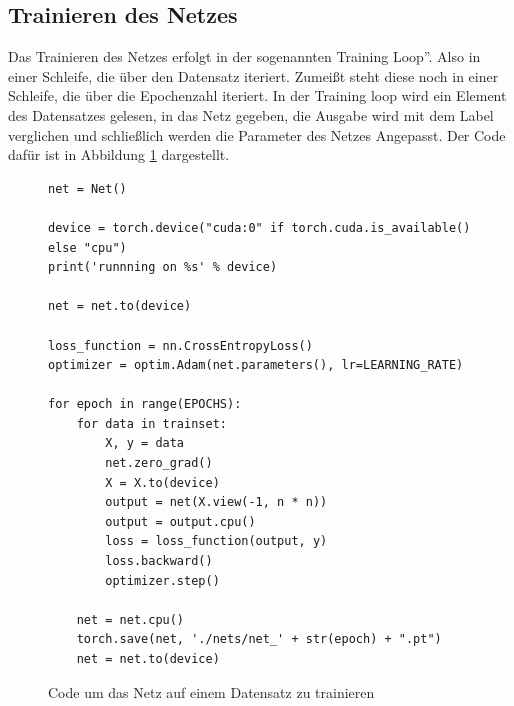 \documentclass[11pt]{article}
\begin{document}
\subsection{Trainieren des Netzes}
Das Trainieren des Netzes erfolgt in der sogenannten \glqq Training Loop''. Also in einer Schleife, die über den Datensatz iteriert. Zumeißt steht diese noch in einer Schleife, die über die Epochenzahl iteriert. In der Training loop wird ein Element des Datensatzes gelesen, in das Netz gegeben, die Ausgabe wird mit dem Label verglichen und schließlich werden die Parameter des Netzes Angepasst. Der Code dafür ist in Abbildung \ref{Code_train_loop} dargestellt.
 \begin{figure}[h]
 	\begin{verbatim}
net = Net()

device = torch.device("cuda:0" if torch.cuda.is_available() else "cpu")
print('runnning on %s' % device)

net = net.to(device)

loss_function = nn.CrossEntropyLoss()
optimizer = optim.Adam(net.parameters(), lr=LEARNING_RATE)

for epoch in range(EPOCHS):
	for data in trainset:
		X, y = data
		net.zero_grad() 
		X = X.to(device)
		output = net(X.view(-1, n * n))
		output = output.cpu()
		loss = loss_function(output, y)  
		loss.backward() 
		optimizer.step()  
		
	net = net.cpu()
	torch.save(net, './nets/net_' + str(epoch) + ".pt")
	net = net.to(device)

 	\end{verbatim}
 	\caption{Code um das Netz auf einem Datensatz zu trainieren}
 	\label{Code_train_loop}
 \end{figure}\\
\end{document}
